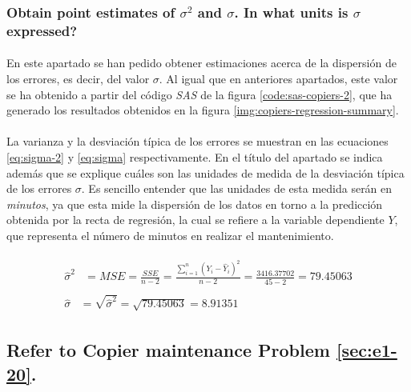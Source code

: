 \documentclass{article}
\begin{document}
      \subsubsection{Obtain point estimates of $\sigma^2$ and $\sigma$. In what units is $\sigma$ expressed?}

        \paragraph{}
        En este apartado se han pedido obtener estimaciones acerca de la dispersión de los errores, es decir, del valor $\sigma$. Al igual que en anteriores apartados, este valor se ha obtenido a partir del código \emph{SAS} de la figura \ref{code:sas-copiers-2}, que ha generado los resultados obtenidos en la figura \ref{img:copiers-regression-summary}.

        \paragraph{}
        La varianza y la desviación típica de los errores se muestran en las ecuaciones \eqref{eq:sigma-2} y \eqref{eq:sigma} respectivamente. En el título del apartado se indica además que se explique cuáles son las unidades de medida de la desviación típica de los errores $\sigma$. Es sencillo entender que las unidades de esta medida serán en \emph{minutos}, ya que esta mide la dispersión de los datos en torno a la predicción obtenida por la recta de regresión, la cual se refiere a la variable dependiente $Y$, que representa el número de minutos en realizar el mantenimiento.

        \begin{align}
        \label{eq:sigma-2}
          \begin{split}
            \widehat{\sigma}^2 &= MSE = \frac{SSE}{n-2} = \frac{\sum_{i=1}^n(Y_i - \widehat{Y}_i)^2}{n-2} = \frac{3416.37702}{45-2} = 79.45063
          \end{split} \\
        \label{eq:sigma}
          \begin{split}
            \widehat{\sigma} &= \sqrt{\widehat{\sigma}^2} = \sqrt{79.45063} = 8.91351
          \end{split}
        \end{align}

    \setcounter{section}{2}
    \setcounter{subsection}{4}
    \subsection{Refer to \textbf{Copier maintenance} Problem \ref{sec:e1-20}.}
    \label{sec:copiers-2.5}
\end{document}
